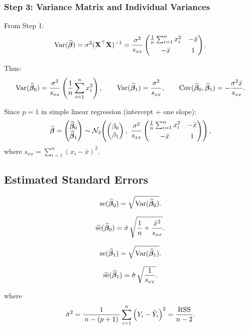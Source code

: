 \subsubsection{Step 3: Variance Matrix and Individual Variances}

From Step 1:
\[
\operatorname{Var}(\widehat{\boldsymbol{\beta}})
=
\sigma^2(\mathbf{X}^\top\mathbf{X})^{-1}
=
\frac{\sigma^2}{s_{xx}}
\begin{pmatrix}
\frac{1}{n}\sum_{i=1}^n x_i^2 & -\bar{x}\\[0.4em]
-\bar{x} & 1
\end{pmatrix}.
\]

Thus:
\[
\operatorname{Var}(\widehat{\boldsymbol{\beta}}_0)
=
\frac{\sigma^2}{s_{xx}}\left(\frac{1}{n}\sum_{i=1}^n x_i^2\right),
\qquad
\operatorname{Var}(\widehat{\boldsymbol{\beta}}_1)
=
\frac{\sigma^2}{s_{xx}},
\qquad
\operatorname{Cov}(\widehat{\boldsymbol{\beta}}_0,\widehat{\boldsymbol{\beta}}_1)
=
-\frac{\sigma^2\bar{x}}{s_{xx}}.
\]

\begin{keyresult}
Since $p=1$ in simple linear regression (intercept + one slope):
\[
\widehat{\boldsymbol{\beta}}
=
\begin{pmatrix}
\widehat{\boldsymbol{\beta}}_0\\
\widehat{\boldsymbol{\beta}}_1
\end{pmatrix}
\sim
\mathcal{N}_2\!\left(
\begin{pmatrix}
\beta_0\\
\beta_1
\end{pmatrix},
\ \frac{\sigma^2}{s_{xx}}
\begin{pmatrix}
\frac{1}{n}\sum_{i=1}^n x_i^2 & -\bar{x}\\[0.4em]
-\bar{x} & 1
\end{pmatrix}
\right),
\]
where $s_{xx}=\sum_{i=1}^n (x_i-\bar{x})^2$.
\end{keyresult}

\subsection{Estimated Standard Errors}

\[
\mathrm{se}(\widehat{\boldsymbol{\beta}}_0) = \sqrt{\operatorname{Var}(\widehat{\boldsymbol{\beta}}_0)}.
\]

\[
\widehat{\mathrm{se}}(\widehat{\boldsymbol{\beta}}_0)
= \hat{\sigma}\,
\sqrt{
\frac{1}{n}
+
\frac{\bar{x}^2}{s_{xx}}
}.
\]

\[
\mathrm{se}(\widehat{\boldsymbol{\beta}}_1) = \sqrt{\operatorname{Var}(\widehat{\boldsymbol{\beta}}_1)}.
\]

\[
\widehat{\mathrm{se}}(\widehat{\boldsymbol{\beta}}_1)
=  \hat{\sigma}\,
\sqrt{
\frac{1}{s_{xx}}
}.
\]

where
\[
\hat{\sigma}^2
=
\frac{1}{\,n-(p+1)\,}
\sum_{i=1}^n \left( Y_i - \hat{Y}_i \right)^2 = \frac{\mathrm{RSS}}{n-2}.
\]

